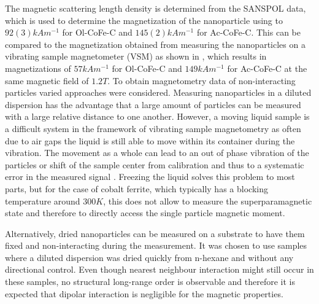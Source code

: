 \documentclass[\main/dresen_thesis.tex]{subfiles}
\begin{document}
    The magnetic scattering length density is determined from the SANSPOL data, which is used to determine the magnetization of the nanoparticle using  to $92(3) \unit{kAm^{-1}}$ for Ol-CoFe-C and $145(2) \unit{kAm^{-1}}$ for Ac-CoFe-C.
    This can be compared to the magnetization obtained from measuring the nanoparticles on a vibrating sample magnetometer (VSM) as shown in , which results in magnetizations of $57 \unit{kAm^{-1}}$ for Ol-CoFe-C and $149 \unit{kAm^{-1}}$ for Ac-CoFe-C at the same magnetic field of $1.2 \unit{T}$.
    To obtain magnetometry data of non-interacting particles varied approaches were considered.
    Measuring nanoparticles in a diluted dispersion has the advantage that a large amount of particles can be measured with a large relative distance to one another.
    However, a moving liquid sample is a difficult system in the framework of vibrating sample magnetometry as often due to air gaps the liquid is still able to move within its container during the vibration.
    The movement as a whole can lead to an out of phase vibration of the particles or shift of the sample center from calibration and thus to a systematic error in the measured signal \cite{Boekelheide_2016_Artif}.
    Freezing the liquid solves this problem to most parts, but for the case of cobalt ferrite, which typically has a blocking temperature around $300 \unit{K}$, this does not allow to measure the superparamagnetic state and therefore to directly access the single particle magnetic moment.

    Alternatively, dried nanoparticles can be measured on a substrate to have them fixed and non-interacting during the measurement.
    It was chosen to use samples where a diluted dispersion was dried quickly from n-hexane and without any directional control.
    Even though nearest neighbour interaction might still occur in these samples, no structural long-range order is observable and therefore it is expected that dipolar interaction is negligible for the magnetic properties.
\end{document}
